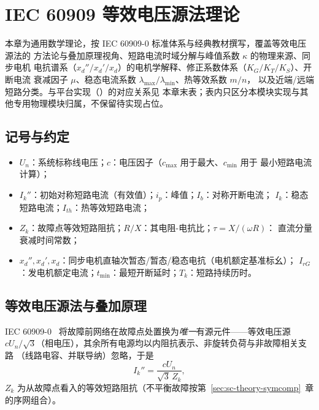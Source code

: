 
\section{IEC 60909 等效电压源法理论}\label{sec:sc-theory-iec}

\begin{theorynote}
本章为通用数学理论，按 IEC 60909-0 标准体系与经典教材撰写，覆盖等效电压源法的
方法论与叠加原理视角、短路电流时域分解与峰值系数 $\kappa$ 的物理来源、同步电机
电抗谱系（$x_d''/x_d'/x_d$）的电机学解释、修正系数体系（$K_G/K_T/K_S$）、开断电流
衰减因子 $\mu$、稳态电流系数 $\lambda_{\max}/\lambda_{\min}$、热等效系数 $m/n$，
以及近端/远端短路分类。与平台实现（）的对应关系见
本章末表；表内只区分本模块实现与其他专用物理模块归属，不保留待实现占位。
\end{theorynote}

\subsection{记号与约定}
\begin{itemize}
  \item $U_n$：系统标称线电压；$c$：电压因子（$c_{\max}$ 用于最大、$c_{\min}$ 用于
        最小短路电流计算）；
  \item $I_k''$：初始对称短路电流（有效值）；$i_p$：峰值；$I_b$：对称开断电流；
        $I_k$：稳态短路电流；$I_{th}$：热等效短路电流；
  \item $Z_k$：故障点等效短路阻抗；$R/X$：其电阻-电抗比；$\tau=X/(\omega R)$：
        直流分量衰减时间常数；
  \item $x_d'',x_d',x_d$：同步电机直轴次暂态/暂态/稳态电抗（电机额定基准标幺）；
        $I_{rG}$：发电机额定电流；$t_{\min}$：最短开断延时；$T_k$：短路持续历时。
\end{itemize}

\subsection{等效电压源法与叠加原理}
\begin{definition}[等效电压源法]
IEC 60909-0~\cite{iec:iec60909-0} 将故障前网络在故障点处置换为\emph{唯一}有源元件——等效电压源
$cU_n/\sqrt3$（相电压），其余所有电源均以内阻抗表示、非旋转负荷与非故障相关支路
（线路电容、并联导纳）忽略，于是
\begin{equation}
I_k''=\frac{cU_n}{\sqrt3\,Z_k},
\end{equation}
$Z_k$ 为从故障点看入的等效短路阻抗（不平衡故障按第~\ref{sec:sc-theory-symcomp}~章
的序网组合）。
\end{definition}

